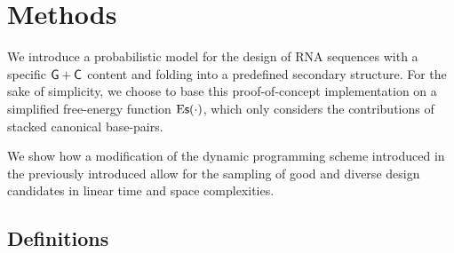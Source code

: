 \section{Methods}
\label{sec:methods}



We introduce a probabilistic model for the design of RNA sequences with a specific ${\sf{G}}+{\sf{C}}$ content and folding into a predefined secondary structure.
For the sake of simplicity, we choose to base this proof-of-concept implementation on a simplified free-energy function $\text{E{\sf s}}(\cdot)$, which only considers the contributions of 
stacked canonical base-pairs. 

We show how a modification of the dynamic programming scheme introduced in the previously introduced \RNAmutants allow for the sampling of good and diverse design candidates in linear time and space complexities.


%
%
\subsection{Definitions}

